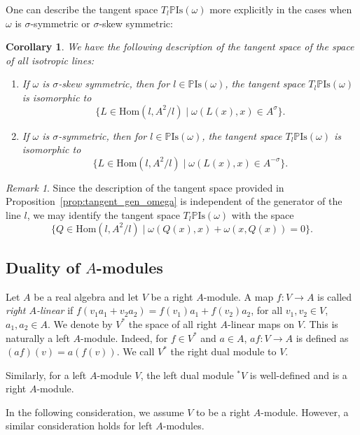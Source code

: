\documentclass[oneside,11pt]{amsart}
\newtheorem{cor}[thm]{Corollary}
\theoremstyle{definition}
\theoremstyle{remark}
\newtheorem{rem}[thm]{Remark}
\numberwithin{thm}{section}
\numberwithin{equation}{section}
\begin{document}
One can describe  the tangent space ${{T}_l}\mathbb{P}\mathrm{Is}\left( {{\omega }} \right)$ more explicitly in the cases when $\omega$ is $\sigma$-symmetric or $\sigma$-skew symmetric:
\begin{cor}\label{cor:tangent_skew_invariant}
We have the following description of the tangent space of the space of all isotropic lines:
\begin{enumerate}
    \item If $\omega$ is $\sigma$-skew symmetric, then for $l\in \mathbb P\mathrm{Is}(\omega)$, the tangent space ${{T}_l}\mathbb{P}\mathrm{Is}\left( {{\omega }} \right)$ is isomorphic to
    $$\{L\in\mathrm{Hom}(l,A^2/l)\mid \omega(L(x),x)\in A^\sigma\}.$$
    \item If $\omega$ is $\sigma$-symmetric, then for $l\in \mathbb P\mathrm{Is}(\omega)$, the tangent space ${{T}_l}\mathbb{P}\mathrm{Is}\left( {{\omega }} \right)$ is isomorphic to
    $$\{L\in\mathrm{Hom}(l,A^2/l)\mid \omega(L(x),x)\in A^{-\sigma}\}.$$
\end{enumerate}    
\end{cor}

\begin{rem}
    Since the description of the tangent space provided in Proposition~\ref{prop:tangent_gen_omega} is independent of the generator of the line $l$, we may identify the tangent space $T_l\mathbb{P}\mathrm{Is}\left( {{\omega }} \right)$ with the space 
    \[\{Q\in\mathrm{Hom}(l,A^2/l)\mid \omega(Q(x),x)+\omega(x,Q(x))=0\}.\]
\end{rem}


\subsection{Duality of \texorpdfstring{$A$}{A}-modules}\label{sec:duality}

Let $A$ be a real algebra and let $V$ be a right $A$-module. A map $f\colon V\to A$ is called \emph{right $A$-linear} if $f(v_1a_1+v_2a_2)=f(v_1)a_1+f(v_2)a_2$, for all $v_1,v_2\in V$, $a_1,a_2\in A$. We denote by $V^*$ the space of all right $A$-linear maps on $V$. This is naturally a left $A$-module. Indeed, for $f\in V^*$ and $a\in A$, $af\colon V\to A$ is defined as $(af)(v)=a(f(v))$. We call $V^*$ the right dual module to $V$.

Similarly, for a left $A$-module $V$, the left dual module ${}^*V$ is well-defined and is a right $A$-module.

In the following consideration, we assume $V$ to be a right $A$-module. However, a similar consideration holds for left $A$-modules.
\end{document}
